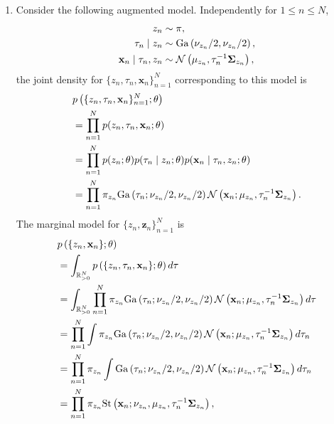 \begin{enumerate}[label = (\alph*)]
    \item Consider the following augmented model. Independently for $1 \le n \le N$,
    \begin{align*}
        z_n &\sim \mathbf{\pi}, \\
        \tau_n\mid z_n &\sim \mathrm{Ga}\left(\nu_{z_n}/2,\nu_{z_n}/2 \right), \\
        \mathbf{x}_n \mid \tau_n,z_n &\sim {\mathcal N}\left(\mathbf{\mu}_{z_n}, \tau_n^{-1}\mathbf{\Sigma}_{z_n}\right), 
    \end{align*}
    the joint density for $\{z_n,\tau_n,\mathbf{x}_n\}_{n=1}^N$ corresponding to this model is
    \begin{align*}
        &p\left(\{z_n,\tau_n,\mathbf{x}_n\}_{n=1}^N;\mathbf{\theta}\right)\\
        &=\prod_{n=1}^N p(z_n,\tau_n,\mathbf{x}_n;\mathbf{\theta})\\
        &=\prod_{n=1}^N p(z_n;\mathbf{\theta})p(\tau_n\mid z_n;\mathbf{\theta})p(\mathbf{x}_n\mid \tau_n,z_n;\mathbf{\theta}) \\
        &=\prod_{n=1}^N \pi_{z_n}\mathrm{Ga}\left(\tau_n; \nu_{z_n}/2, \nu_{z_n}/2\right){\mathcal N}\left(\mathbf{x}_n; \mathbf{\mu}_{z_n}, \tau_{n}^{-1}\mathbf{\Sigma}_{z_n}\right).
    \end{align*}
    The marginal model for $\{z_n,\mathbf{z}_n\}_{n=1}^N$ is
    \begin{align*}
        &p\left(\{z_n,\mathbf{x}_n\};\mathbf{\theta}\right)\\
        &=\int_{\reals_{> 0}^N} p\left(\{z_n,\tau_n,\mathbf{x}_n\};\mathbf{\theta}\right)d\mathbf{\tau}\\
        &=\int_{\reals_{> 0}^N} \prod_{n=1}^N \pi_{z_n}\mathrm{Ga}\left(\tau_n; \nu_{z_n}/2, \nu_{z_n}/2\right)\calN\left(\mathbf{x}_n; \mathbf{\mu}_{z_n}, \tau_{n}^{-1}\mathbf{\Sigma}_{z_n}\right)d\mathbf{\tau}\\
        &=\prod_{n=1}^N \int  \pi_{z_n}\mathrm{Ga}\left(\tau_n; \nu_{z_n}/2, \nu_{z_n}/2\right)\calN\left(\mathbf{x}_n; \mathbf{\mu}_{z_n}, \tau_{n}^{-1}\mathbf{\Sigma}_{z_n}\right)d\tau_n \\
        &=\prod_{n=1}^N \pi_{z_n}\int  \mathrm{Ga}\left(\tau_n; \nu_{z_n}/2, \nu_{z_n}/2\right)\calN\left(\mathbf{x}_n; \mathbf{\mu}_{z_n}, \tau_{n}^{-1}\mathbf{\Sigma}_{z_n}\right)d\tau_n\\
        &=\prod_{n=1}^N \pi_{z_n}\mathrm{St}\left(\mathbf{x}_n; \nu_{z_n}, \mathbf{\mu}_{z_n}, \tau_{n}^{-1}\mathbf{\Sigma}_{z_n}\right),

\end{align*}
\end{enumerate}
